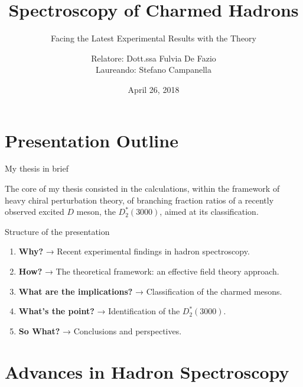 \documentclass[professionalfonts,aspectratio=169]{beamer}
\begin{document}
\author{Relatore: Dott.ssa Fulvia De Fazio \\ Laureando: Stefano Campanella}
\title{Spectroscopy of Charmed Hadrons}
\subtitle{Facing the Latest Experimental Results with the Theory}
\date{April 26, 2018}

\maketitle

\section{Presentation Outline}

\begin{frame}{My thesis in brief}

  The core of my thesis consisted in the calculations, within the framework
  of heavy chiral perturbation theory, of branching fraction ratios
  of a recently observed excited $D$ meson, the $\left. D \right.^*_2(3000)$, 
  aimed at its classification.

\end{frame}

\begin{frame}{Structure of the presentation}
  \begin{enumerate}
    \item \textbf{Why?} → Recent experimental findings in hadron spectroscopy.
      \pause
    \item \textbf{How?} → The theoretical framework: an effective field theory approach.
      \pause
    \item \textbf{What are the implications?} → Classification of the charmed mesons.
      \pause
    \item \textbf{What’s the point?} → Identification of the $D^*_2(3000)$.
      \pause
    \item \textbf{So What?} → Conclusions and perspectives.
  \end{enumerate}
\end{frame}

\section{Advances in Hadron Spectroscopy}
\end{document}
